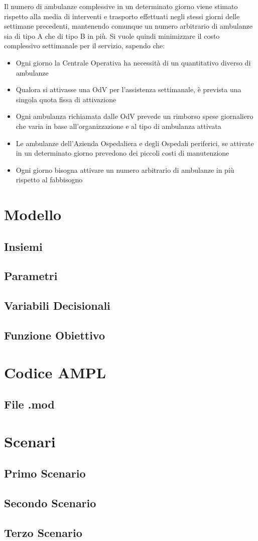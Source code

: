 \documentclass[12pt, a4paper]{article}
\begin{document}
Il numero di ambulanze complessive in un determinato giorno viene stimato rispetto alla media di interventi e trasporto effettuati negli stessi giorni delle settimane precedenti, mantenendo comunque un numero arbitrario di ambulanze sia di tipo A che di tipo B in più.
\newline \newline
Si vuole quindi minimizzare il costo complessivo settimanale per il servizio, sapendo che:
\begin{itemize}
    \item Ogni giorno la Centrale Operativa ha necessità di un quantitativo diverso di ambulanze
    \item Qualora si attivasse una OdV per l'assistenza settimanale, è prevista una singola quota fissa di attivazione
    \item Ogni ambulanza richiamata dalle OdV prevede un rimborso spese giornaliero che varia in base all'organizzazione e al tipo di ambulanza attivata
    \item Le ambulanze dell'Azienda Ospedaliera e degli Ospedali periferici, se attivate in un determinato giorno prevedono dei piccoli costi di manutenzione
    \item Ogni giorno bisogna attivare un numero arbitrario di ambulanze in più rispetto al fabbisogno
\end{itemize}
\newpage
\section{Modello}
\subsection{Insiemi}
\subsection{Parametri}
\subsection{Variabili Decisionali}
\subsection{Funzione Obiettivo}
\newpage
\section{Codice AMPL}
\subsection{File .mod}
\newpage
\section{Scenari}
\subsection{Primo Scenario}
\subsection{Secondo Scenario}
\subsection{Terzo Scenario}
\end{document}

